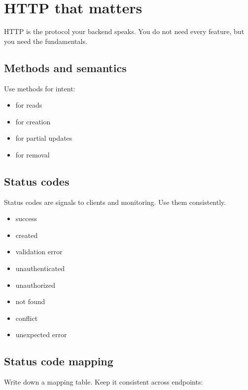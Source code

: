 \chapter{HTTP that matters}

HTTP is the protocol your backend speaks.
You do not need every feature, but you need the fundamentals.

\section{Methods and semantics}
Use methods for intent:
\begin{itemize}[nosep]
  \item {} for reads
  \item {} for creation
  \item {} for partial updates
  \item {} for removal
\end{itemize}

\section{Status codes}
Status codes are signals to clients and monitoring.
Use them consistently.

\begin{itemize}[nosep]
  \item {} success
  \item {} created
  \item {} validation error
  \item {} unauthenticated
  \item {} unauthorized
  \item {} not found
  \item {} conflict
  \item {} unexpected error
\end{itemize}

\section{Status code mapping}
Write down a mapping table.
Keep it consistent across endpoints:

